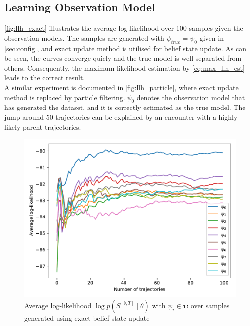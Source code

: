 \subsection{Learning Observation Model}
\autoref{fig:llh_exact} illustrates the average log-likelihood over 100 samples given the observation models. The samples are generated with $ \psi_{true} = \psi_0 $ given in \cref{sec:config}, and exact update method is utilised for belief state update. As can be seen, the curves converge quicly and the true model is well separated from others. Consequently, the maximum likelihood estimation by \autoref{eq:max_llh_est} leads to the correct result. \\
A similar experiment is documented in \autoref{fig:llh_particle}, where exact update method is replaced by particle filtering. $ \psi_0 $ denotes the observation model that has generated the dataset, and it is correctly estimated as the true model. The jump around 50 trajectories can be explained by an encounter with a highly likely parent trajectories.
\begin{figure}[H]
	\begin{center}
		\includegraphics[width=.75\textwidth]{figures/roc_analysis/roc_exactUpdate/llh_exactUpdate_psi_0}
		\caption[Average log-likelihood in the case of exact belief update]{Average log-likelihood $ \log p(S^{[0,T]} \mid \theta) $ with $ \psi_i \in \symbf{\psi} $ over samples generated using exact belief state update}
		\label{fig:llh_exact}
	\end{center}
\end{figure}
